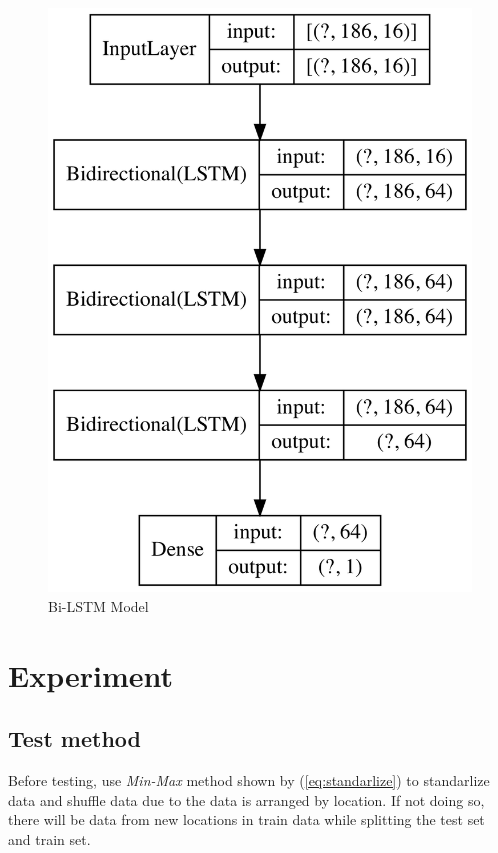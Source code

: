 \documentclass[conference]{IEEEtran}
\begin{document}
      \begin{figure}[htbp]
        \centerline{\includegraphics[width=\linewidth]{figures/Model_figure.png}}
        \caption{Bi-LSTM Model}
        \label{fig:model}
      \end{figure}


\section{Experiment} \label{sec:ex}
\subsection{Test method}
Before testing, use \textit{Min-Max} method shown by (\ref{eq:standarlize}) to standarlize data and shuffle data due to the data is arranged by location. If not doing so, there will be data from new locations in train data while splitting the test set and train set.
\end{document}
